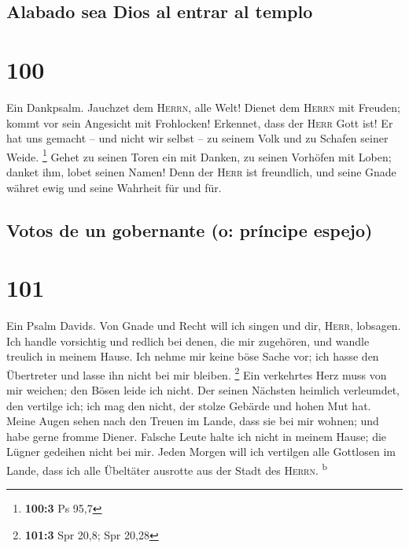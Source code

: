 \hypertarget{alabado-sea-dios-al-entrar-al-templo}{%
\subsection{Alabado sea Dios al entrar al
templo}\label{alabado-sea-dios-al-entrar-al-templo}}

\hypertarget{section-99}{%
\section{100}\label{section-99}}

 Ein Dankpsalm. Jauchzet dem \textsc{Herrn}, alle Welt!
 Dienet dem \textsc{Herrn} mit Freuden; kommt vor sein
Angesicht mit Frohlocken!  Erkennet, dass der
\textsc{Herr} Gott ist! Er hat uns gemacht -- und nicht wir selbst -- zu
seinem Volk und zu Schafen seiner Weide. \footnote{\textbf{100:3} Ps
  95,7}  Gehet zu seinen Toren ein mit Danken, zu seinen
Vorhöfen mit Loben; danket ihm, lobet seinen Namen!  Denn
der \textsc{Herr} ist freundlich, und seine Gnade währet ewig und seine
Wahrheit für und für.

\hypertarget{votos-de-un-gobernante-o-pruxedncipe-espejo}{%
\subsection{Votos de un gobernante (o: príncipe
espejo)}\label{votos-de-un-gobernante-o-pruxedncipe-espejo}}

\hypertarget{section-100}{%
\section{101}\label{section-100}}

 Ein Psalm Davids. Von Gnade und Recht will ich singen und
dir, \textsc{Herr}, lobsagen.  Ich handle vorsichtig und
redlich bei denen, die mir zugehören, und wandle treulich in meinem
Hause.  Ich nehme mir keine böse Sache vor; ich hasse den
Übertreter und lasse ihn nicht bei mir bleiben. \footnote{\textbf{101:3}
  Spr 20,8; Spr 20,28}  Ein verkehrtes Herz muss von mir
weichen; den Bösen leide ich nicht.  Der seinen Nächsten
heimlich verleumdet, den vertilge ich; ich mag den nicht, der stolze
Gebärde und hohen Mut hat.  Meine Augen sehen nach den
Treuen im Lande, dass sie bei mir wohnen; und habe gerne fromme Diener.
 Falsche Leute halte ich nicht in meinem Hause; die Lügner
gedeihen nicht bei mir.  Jeden Morgen will ich vertilgen
alle Gottlosen im Lande, dass ich alle Übeltäter ausrotte aus der Stadt
des \textsc{Herrn}. \textsuperscript{b}

